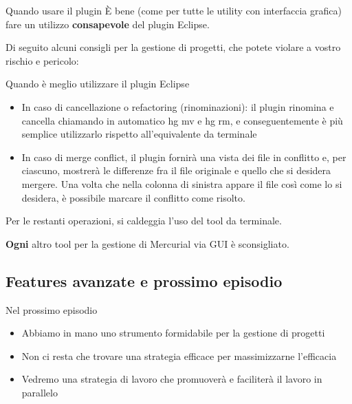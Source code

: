 \documentclass[presentation]{beamer}
\begin{document}
\begin{frame}{Quando usare il plugin}
	È bene (come per tutte le utility con interfaccia grafica) fare un utilizzo \textbf{consapevole} del plugin Eclipse.
	
	Di seguito alcuni consigli per la gestione di progetti, che potete violare a vostro rischio e pericolo:
	
	\begin{block}{Quando è meglio utilizzare il plugin Eclipse}
		\begin{itemize}
			\item In caso di cancellazione o refactoring (rinominazioni): il plugin rinomina e cancella chiamando in automatico hg mv e hg rm, e conseguentemente è più semplice utilizzarlo rispetto all'equivalente da terminale
			\item In caso di merge conflict, il plugin fornirà una vista dei file in conflitto e, per ciascuno, mostrerà le differenze fra il file originale e quello che si desidera mergere. Una volta che nella colonna di sinistra appare il file così come lo si desidera, è possibile marcare il conflitto come risolto.
		\end{itemize}
	\end{block}
	
	Per le restanti operazioni, si caldeggia l'uso del tool da terminale.
	
	\textbf{Ogni} altro tool per la gestione di Mercurial via GUI è sconsigliato.
\end{frame}

\subsection{Features avanzate e prossimo episodio}


\begin{frame}{Nel prossimo episodio}
	\begin{itemize}
		\item Abbiamo in mano uno strumento formidabile per la gestione di progetti
		\item Non ci resta che trovare una strategia efficace per massimizzarne l'efficacia
		\item Vedremo una strategia di lavoro che promuoverà e faciliterà il lavoro in parallelo
	\end{itemize}
\end{frame}
\end{document}
